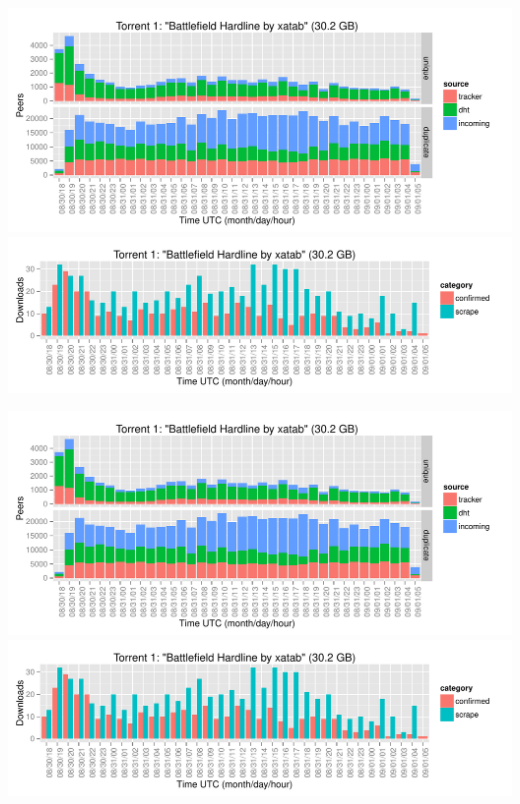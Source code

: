 \documentclass[10pt, a4paper, twoside=false, headsepline]{scrbook}
\renewcommand{\_}{\origunderscore\allowbreak}
\begin{document}
\begin{minipage}{\textwidth}
\includegraphics[width=\textwidth, page=\value{TorrentPage}]{../result/2015-08-30_20-combined_source_per_torrent}
\includegraphics[width=\textwidth, page=\value{TorrentPage}]{../result/2015-08-30_20-combined_download_each}
\end{minipage}

\begin{minipage}{\textwidth}
\includegraphics[width=\textwidth, page=\value{TorrentPage}]{../result/2015-08-30_20-combined_source_per_torrent}
\includegraphics[width=\textwidth, page=\value{TorrentPage}]{../result/2015-08-30_20-combined_download_each}
\end{minipage}
\end{document}
